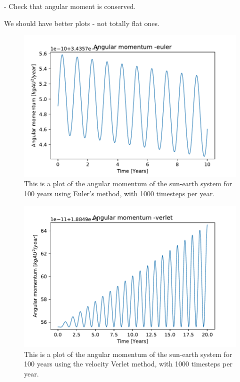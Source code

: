 	- Check that angular moment is conserved. 

We should have better plots - not totally flat ones.

\begin{figure}[H]
\includegraphics[width=1.1\linewidth]{../results/plots/angularmomentum-euler.pdf}\caption{This is a plot of the angular momentum of the sun-earth system for 100 years using Euler's method, with 1000 timesteps per year.}\label{fig:angluarmomentum-euler}
\end{figure}	

\begin{figure}[H]
\includegraphics[width=1.1\linewidth]{../results/plots/angularmomentum-verlet.pdf}\caption{This is a plot of the angular momentum of the sun-earth system for 100 years using the velocity Verlet method, with 1000 timesteps per year.}\label{fig:angularmomentum-verlet}
\end{figure}	

